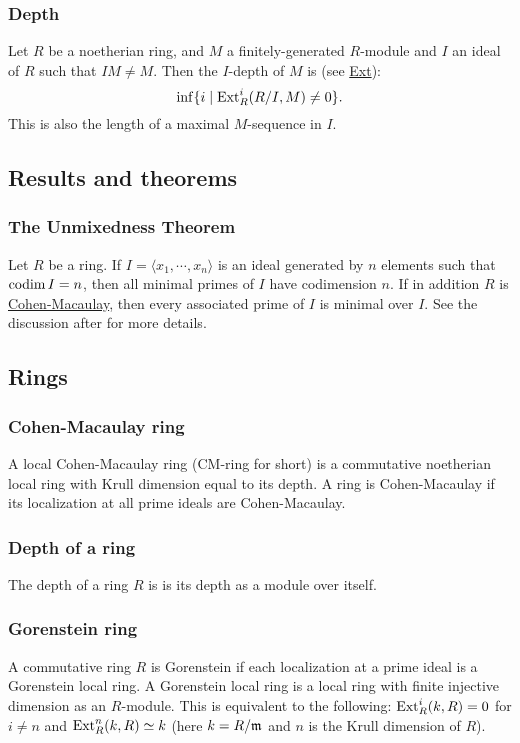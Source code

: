 \documentclass[11pt, english]{article}
\begin{document}
\subsubsection{Depth}
Let $R$ be a noetherian ring, and $M$ a finitely-generated $R$-module and $I$ an ideal of $R$ such that $IM \neq M$. Then the $I$-depth of $M$ is (see \hyperref[ext]{Ext}): \[\inf\{i \mid \operatorname{\mathrm{Ext}}^i_R(R/I,M) \neq 0\}.\]
This is also the length of a maximal $M$-sequence in $I$.

\subsection{Results and theorems}
\subsubsection{The Unmixedness Theorem}
Let $R$ be a ring. If $I=\langle x_1,\cdots,x_n\rangle $ is an ideal generated by $n$ elements such that $\operatorname{codim} I=n$, then all minimal primes of $I$ have codimension $n$. If in addition $R$ is \hyperref[cmring]{Cohen-Macaulay}, then every associated prime of $I$ is minimal over $I$. See the discussion after \cite[Corollary 18.14]{eisenbud} for more details. 

\subsection{Rings}
\subsubsection{Cohen-Macaulay ring}
\label{cmring}
A local Cohen-Macaulay ring (CM-ring for short) is a commutative noetherian local ring with Krull dimension equal to its depth. A ring is Cohen-Macaulay if its localization at all prime ideals are Cohen-Macaulay.

\subsubsection{Depth of a ring}

The depth of a ring $R$ is is its depth as a module over itself.

\subsubsection{Gorenstein ring}

A commutative ring $R$ is Gorenstein if each localization at a prime ideal is a Gorenstein local ring. A Gorenstein local ring is a local ring with finite injective dimension as an $R$-module. This is equivalent to the following: $\operatorname{\mathrm{Ext}}_R^i(k,R)=0$ for $i \neq n$ and $\operatorname{\mathrm{Ext}}_R^n(k,R) \simeq k$ (here $k = R/\mathfrak{m}$ and $n$ is the Krull dimension of $R$).
\end{document}

